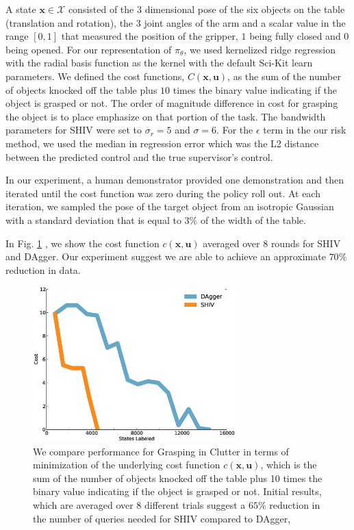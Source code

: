 \documentclass[10pt, conference]{ieeeconf}      %
\newcommand{\bu}{\mathbf{u}}
\newcommand{\bx}{\mathbf{x}}
\begin{document}
A state $\bx\in \mathcal{X}$ consisted of the 3 dimensional pose of the six objects on the table (translation and rotation), the 3 joint angles of the arm and a scalar value in the range $[0,1]$ that measured the position of the gripper, $1$ being fully closed and $0$ being opened. For our representation of $\pi_{\theta}$, we used kernelized ridge regression with the radial basis function as the kernel with the default Sci-Kit learn parameters. We defined the cost functions, $C(\bx,\bu)$, as the sum of the number of objects knocked off the table plus $10$ times the binary value indicating if the object is grasped or not. The order of magnitude difference in cost for grasping the object is to place emphasize on that portion of the task. The bandwidth parameters for SHIV were set to $\sigma_r = 5$ and $\sigma = 6$. For the $\epsilon$ term in the our risk method, we used the median in regression error which was the L2 distance between the predicted control and the true supervisor's control. 

In our experiment, a human demonstrator provided one demonstration and then iterated until the cost function was zero during the policy roll out. At each iteration, we sampled the pose of the target object from an isotropic Gaussian with a standard deviation that is equal to $3\%$ of the width of the table. 

In Fig. \ref{fig:grasp_cost} , we show the cost function $c(\bx,\bu)$ averaged over 8 rounds for SHIV and DAgger.
Our experiment suggest we are able to achieve an approximate $70\%$ reduction in data. 

\begin{figure}[t!]
\centering
\includegraphics[width=\columnwidth, height=6cm]{figures/grasp_clutter.eps}
\caption{We compare performance for Grasping in Clutter in terms of minimization of the underlying cost function $c(\bx,\bu)$, which is the sum of the number of objects knocked off the table plus 10 times the binary value indicating if the object is grasped or not. Initial results, which are averaged over 8 different trials suggest a $65\%$ reduction in the number of queries needed for SHIV compared to DAgger,}
\vspace*{-10pt}
\label{fig:grasp_cost}
\end{figure}
\end{document}
